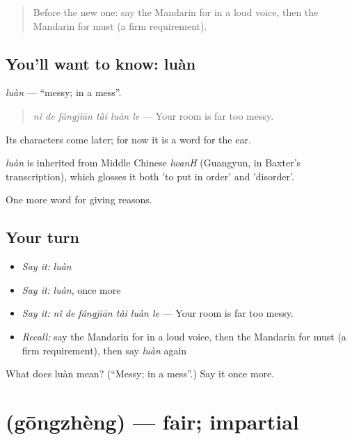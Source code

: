 \begin{quote}
Before the new one: say the Mandarin for in a loud voice, then the Mandarin for must (a firm requirement).
\end{quote}

\subsection*{You'll want to know: luàn}
\emph{luàn} — \textquotedblleft{}messy; in a mess\textquotedblright{}.

\begin{quote}
\emph{nǐ de fángjiān tài luàn le} — Your room is far too messy.
\end{quote}

Its characters come later; for now it is a word for the ear.

\begin{cousinweb}
\emph{luàn} is inherited from Middle Chinese \emph{lwanH} (Guangyun, in Baxter's transcription), which glosses it both 'to put in order' and 'disorder'.
\end{cousinweb}

\begin{grammarlens}[title={What you've built}]
One more word for giving reasons.
\end{grammarlens}

\subsection*{Your turn}
\begin{itemize}
\raggedright
  \item \emph{Say it:} \emph{luàn}
  \item \emph{Say it:} \emph{luàn}, once more
  \item \emph{Say it:} \emph{nǐ de fángjiān tài luàn le} — Your room is far too messy.
  \item \emph{Recall:} say the Mandarin for in a loud voice, then the Mandarin for must (a firm requirement), then say \emph{luàn} again
\end{itemize}

\begin{tcolorbox}[breakable,colback=teal!4,colframe=teal!35!black,title={Before you move on}]
What does luàn mean? (\textquotedblleft{}Messy; in a mess\textquotedblright{}.) Say it once more.
\end{tcolorbox}
\section[\texorpdfstring{\zh{公正} (gōngzhèng)}{公正 (gōngzhèng)}]{ (gōngzhèng) — fair; impartial}

